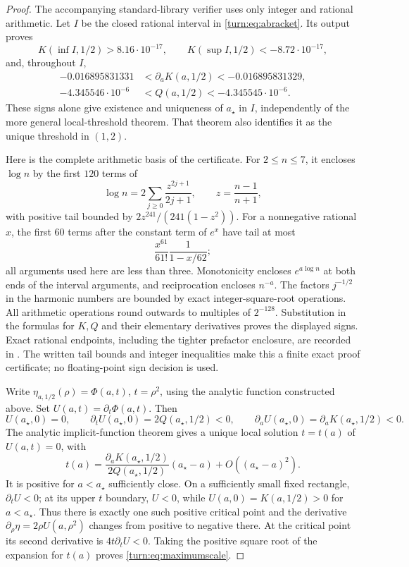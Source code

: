 \begin{proof}
The accompanying standard-library verifier
 uses only integer and rational
arithmetic. Let $I$ be the closed rational interval in
\eqref{turn:eq:abracket}. Its output proves
\[
 K(\inf I,1/2)>8.16\cdot10^{-17},\qquad
 K(\sup I,1/2)<-8.72\cdot10^{-17},
\]
and, throughout $I$,
\begin{align*}
 -0.016895831331&<\partial_aK(a,1/2)<-0.016895831329,\\
 -4.345546\cdot10^{-6}&<Q(a,1/2)<-4.345545\cdot10^{-6}.
\end{align*}
These signs alone give existence and uniqueness of $a_\star$ in
$I$, independently of the more general local-threshold theorem.
That theorem also identifies it as the unique threshold in $(1,2)$.

Here is the complete arithmetic basis of the certificate. For
$2\leq n\leq7$, it encloses $\log n$ by the first $120$ terms of
\[
 \log n=2\sum_{j\geq0}\frac{z^{2j+1}}{2j+1},
 \qquad z=\frac{n-1}{n+1},
\]
with positive tail bounded by
$2z^{241}/(241(1-z^2))$. For a nonnegative rational $x$, the first
$60$ terms after the constant term of $e^x$ have tail at most
\[
 \frac{x^{61}}{61!}\frac1{1-x/62};
\]
all arguments used here are less than three. Monotonicity encloses
$e^{a\log n}$ at both ends of the interval arguments, and reciprocation
encloses $n^{-a}$. The factors $j^{-1/2}$ in the harmonic numbers are
bounded by exact integer-square-root operations. All arithmetic
operations round outwards to multiples of $2^{-128}$. Substitution
in the formulas for $K,Q$ and their elementary derivatives proves the
displayed signs. Exact rational endpoints, including the tighter
prefactor enclosure, are recorded in
. The written tail bounds
and integer inequalities make this a finite exact proof certificate;
no floating-point sign decision is used.

Write $\eta_{a,1/2}(\rho)=\Phi(a,t)$, $t=\rho^2$, using the
analytic function constructed above. Set $U(a,t)=\partial_t\Phi(a,t)$.
Then
\[
 U(a_\star,0)=0,\qquad
 \partial_tU(a_\star,0)=2Q(a_\star,1/2)<0,\qquad
 \partial_aU(a_\star,0)=\partial_aK(a_\star,1/2)<0.
\]
The analytic implicit-function theorem gives a unique local solution
$t=t(a)$ of $U(a,t)=0$, with
\[
 t(a)=\frac{\partial_aK(a_\star,1/2)}{2Q(a_\star,1/2)}
          (a_\star-a)+O((a_\star-a)^2).
\]
It is positive for $a<a_\star$ sufficiently close. On a sufficiently
small fixed rectangle, $\partial_tU<0$; at its upper $t$ boundary,
$U<0$, while $U(a,0)=K(a,1/2)>0$ for $a<a_\star$. Thus there
is exactly one such positive critical point and the derivative
$\partial_\rho\eta=2\rho U(a,\rho^2)$ changes from positive
to negative there. At the critical point its second derivative is
$4t\partial_tU<0$. Taking the positive square root of the expansion
for $t(a)$ proves \eqref{turn:eq:maximumscale}.
\end{proof}

